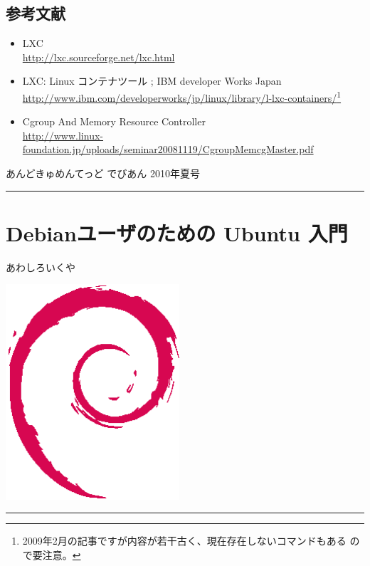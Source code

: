 \documentclass[mingoth,a4paper]{jsarticle}
\renewcommand{\dancersection}[2]{%
\newpage
あんどきゅめんてっど でびあん 2010年夏号
%
\vspace{0.1mm}\\
{\color{dancerlightblue}\rule{\hsize}{2mm}}

%
%
\begin{minipage}[t]{0.6\hsize}
\color{dancerdarkblue}
\vspace{1cm}
\section{#1}
\hfill{}#2\\
\end{minipage}
\begin{minipage}[t]{0.4\hsize}
\vspace{-2cm}
\hfill{}\includegraphics[height=8cm]{image200502/openlogo-nd.eps}\\
\vspace{-5cm}
\end{minipage}
%
%
{\color{dancerdarkblue}\rule{0.74\hsize}{2mm}}
%
\vspace{2cm}
}
\begin{document}
\subsection{参考文献}

\begin{itemize}
\item LXC\\
      \url{http://lxc.sourceforge.net/lxc.html}

\item LXC: Linux コンテナツール ; IBM developer Works Japan\\
      \url{http://www.ibm.com/developerworks/jp/linux/library/l-lxc-containers/}\footnote{
      2009年2月の記事ですが内容が若干古く、現在存在しないコマンドもある
      ので要注意。}
\item Cgroup And Memory Resource Controller\\
      \url{http://www.linux-foundation.jp/uploads/seminar20081119/CgroupMemcgMaster.pdf}
\end{itemize}

\dancersection{Debianユーザのための Ubuntu 入門}{あわしろいくや}
\end{document}
